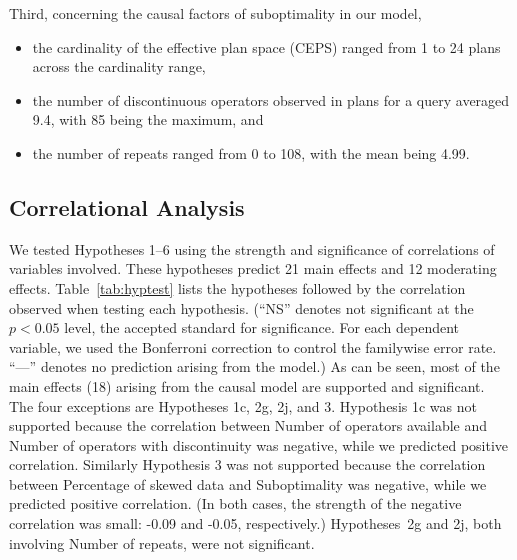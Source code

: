 \documentclass[prodmode,acmtods]{acmsmall}
\begin{document}
Third, concerning the causal factors of suboptimality in our model,
\begin{itemize}
\item the cardinality of the effective plan space (CEPS) ranged from 1 to 24
plans across the cardinality range,
\item the number of discontinuous operators observed in plans for a query
averaged 9.4, with 85 being the maximum, and
\item the number of repeats ranged from 0 to 108, with the mean being 4.99.
\end{itemize}
 
\subsection{Correlational Analysis}\label{sec:corr}
We tested Hypotheses 1--6 using the strength and significance of
correlations of variables involved. These hypotheses predict 21 main effects
and 12 moderating effects. Table~\ref{tab:hyptest} lists the hypotheses
followed by the correlation observed when testing each hypothesis.  (``NS''
denotes not significant at the $p < 0.05$ level, the accepted standard for
significance. For each dependent variable, we used the Bonferroni correction
to control the familywise error rate. ``---'' denotes no prediction arising
from the model.)  As can be seen, most of the main effects (18) arising from
the causal model are supported and significant.  The four exceptions are
Hypotheses 1c, 2g, 2j, and 3. Hypothesis 1c was not supported because the
correlation between Number of operators available and Number of operators
with discontinuity was negative, while we predicted positive
correlation. Similarly Hypothesis 3 was not supported because the
correlation between Percentage of skewed data and Suboptimality was
negative, while we predicted positive correlation. (In both cases, the
strength of the negative correlation was small: -0.09 and -0.05, respectively.) \hbox{Hypotheses}~2g and
2j, both involving Number of repeats, were not significant.
\end{document}
